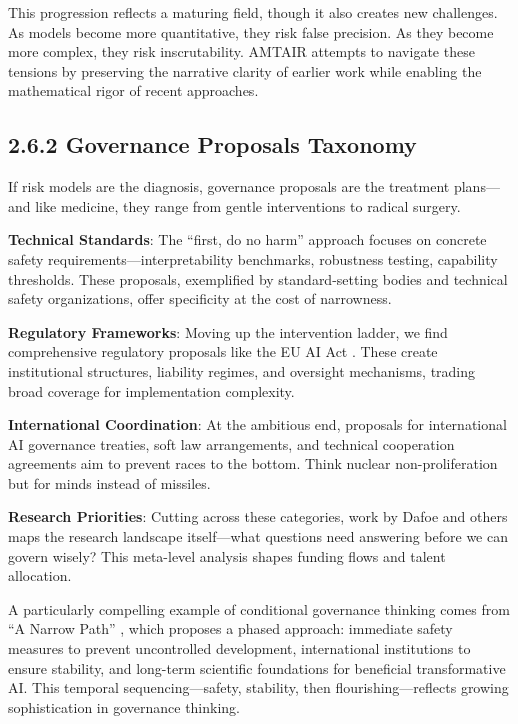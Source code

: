 \documentclass[
  11pt,
  letterpaper,
]{book}
\begin{document}
This progression reflects a maturing field, though it also creates new
challenges. As models become more quantitative, they risk false
precision. As they become more complex, they risk inscrutability. AMTAIR
attempts to navigate these tensions by preserving the narrative clarity
of earlier work while enabling the mathematical rigor of recent
approaches.

\subsection{2.6.2 Governance Proposals
Taxonomy}\label{sec-governance-taxonomy}

If risk models are the diagnosis, governance proposals are the treatment
plans---and like medicine, they range from gentle interventions to
radical surgery.

\textbf{Technical Standards}: The ``first, do no harm'' approach focuses
on concrete safety requirements---interpretability benchmarks,
robustness testing, capability thresholds. These proposals, exemplified
by standard-setting bodies and technical safety organizations, offer
specificity at the cost of narrowness.

\textbf{Regulatory Frameworks}: Moving up the intervention ladder, we
find comprehensive regulatory proposals like the EU AI Act
\textcite{european2024}. These create institutional structures,
liability regimes, and oversight mechanisms, trading broad coverage for
implementation complexity.

\textbf{International Coordination}: At the ambitious end, proposals for
international AI governance treaties, soft law arrangements, and
technical cooperation agreements aim to prevent races to the bottom.
Think nuclear non-proliferation but for minds instead of missiles.

\textbf{Research Priorities}: Cutting across these categories, work by
Dafoe \textcite{dafoe2018} and others maps the research landscape
itself---what questions need answering before we can govern wisely? This
meta-level analysis shapes funding flows and talent allocation.

A particularly compelling example of conditional governance thinking
comes from ``A Narrow Path'' \textcite{miotti2024}, which proposes a
phased approach: immediate safety measures to prevent uncontrolled
development, international institutions to ensure stability, and
long-term scientific foundations for beneficial transformative AI. This
temporal sequencing---safety, stability, then flourishing---reflects
growing sophistication in governance thinking.
\end{document}
